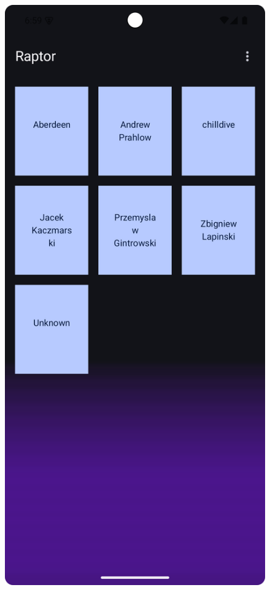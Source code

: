\begin{figure}[H]
	\centering
	\includegraphics[width=1\textwidth]{images/tutorial_after_loading.png}
	\caption{}
	\label{fig:test_after_loading}
\end{figure}

